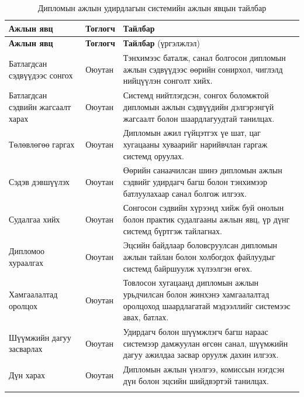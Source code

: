 \begin{longtable}{p{3 cm} p{2.5 cm} p{10.5 cm}}
\caption{Дипломын ажлын удирдлагын системийн ажлын явцын тайлбар} \label{tab:usecase_detail} \\
\toprule
\textbf{Ажлын явц} & \textbf{Тоглогч} & \textbf{Тайлбар} \\
\midrule
\endfirsthead

\toprule
\textbf{Ажлын явц} & \textbf{Тоглогч} & \textbf{Тайлбар} (үргэлжлэл) \\
\midrule
\endhead

\midrule
\endfoot

\bottomrule
\endlastfoot

Батлагдсан сэдвүүдээс сонгох & Оюутан & Тэнхимээс баталж, санал болгосон дипломын ажлын сэдвүүдээс өөрийн сонирхол, чиглэлд нийцүүлэн сонголт хийх. \\ \addlinespace
Батлагдсан сэдвийн жагсаалт харах & Оюутан & Системд нийтлэгдсэн, сонгох боломжтой дипломын ажлын сэдвүүдийн дэлгэрэнгүй жагсаалт болон шаардлагуудтай танилцах. \\ \addlinespace
Төлөвлөгөө гаргах & Оюутан & Дипломын ажил гүйцэтгэх үе шат, цаг хугацааны хуваарийг нарийвчлан гаргаж системд оруулах. \\ \addlinespace
Сэдэв дэвшүүлэх & Оюутан & Өөрийн санаачилсан шинэ дипломын ажлын сэдвийг удирдагч багш болон тэнхимээр батлуулахаар санал болгож илгээх. \\ \addlinespace
Судалгаа хийх & Оюутан & Сонгосон сэдвийн хүрээнд хийж буй онолын болон практик судалгааны ажлын явц, үр дүнг системд бүртгэж тайлагнах. \\ \addlinespace
Дипломоо хураалгах & Оюутан & Эцсийн байдлаар боловсруулсан дипломын ажлын тайлан болон холбогдох файлуудыг системд байршуулж хүлээлгэн өгөх. \\ \addlinespace
Хамгаалалтад оролцох & Оюутан & Товлосон хугацаанд дипломын ажлын урьдчилсан болон жинхэнэ хамгаалалтад оролцоход шаардлагатай мэдээллийг системээс авах, батлах. \\ \addlinespace
Шүүмжийн дагуу засварлах & Оюутан & Удирдагч болон шүүмжлэгч багш нараас системээр дамжуулан өгсөн санал, шүүмжийн дагуу ажилдаа засвар оруулж дахин илгээх. \\ \addlinespace
Дүн харах & Оюутан & Дипломын ажлын үнэлгээ, комиссын нэгдсэн дүн болон эцсийн шийдвэртэй танилцах. \\ \addlinespace

\end{longtable}
